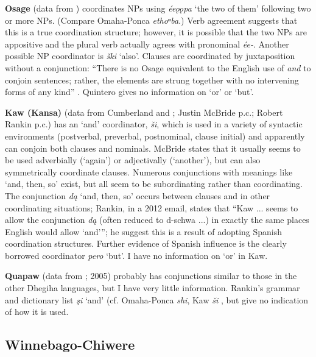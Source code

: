\documentclass[output=paper]{LSP/langsci}
\begin{document}
\textbf{Osage} (data from \citealt{Quintero2004}) coordinates NPs using \textit{\'ee\k{o}\k{o}pa} `the two of them' following two or more NPs. (Compare Omaha-Ponca \textit{ethoⁿba}.) Verb agreement suggests that this is a true coordination structure; however, it is possible that the two NPs are appositive and the plural verb actually agrees with pronominal \textit{\'ee-}. Another possible NP coordinator is \textit{\v{s}ki} `also'. Clauses are coordinated by juxtaposition without a conjunction: ``There is no Osage equivalent to the English use of \textit{and} to conjoin sentences; rather, the elements are strung together with no intervening forms of any kind'' . Quintero gives no information on `or' or `but'.

\textbf{Kaw (Kansa)} (data from Cumberland and \citealt{Rankin2012}; Justin McBride p.c.; Robert Rankin p.c.) has an `and' coordinator, \textit{\v{s}i}, which is used in a variety of syntactic environments (postverbal, preverbal, postnominal, clause initial) and apparently can conjoin both clauses and nominals. McBride states that it usually seems to be used adverbially (`again') or adjectivally (`another'), but can also symmetrically coordinate clauses. Numerous conjunctions with meanings like `and, then, so' exist, but all seem to be subordinating rather than coordinating. The conjunction \textit{d\k{a}} `and, then, so' occurs between clauses and in other coordinating situations; Rankin, in a 2012 email, states that ``Kaw ... seems to allow the conjunction \textit{d\k{a}} (often reduced to d-schwa ...) in exactly the same places English would allow `and'''; he suggest this is a result of adopting Spanish coordination structures. Further evidence of Spanish influence is the clearly borrowed coordinator \textit{pero} `but'. I have no information on `or' in Kaw.

\textbf{Quapaw} (data from \citealt{Rankin2002}; 2005) probably has conjunctions similar to those in the other Dhegiha languages, but I have very little information. Rankin's grammar and dictionary list \textit{\c{s}i} `and' (cf. Omaha-Ponca \textit{shi}, Kaw \textit{\v{s}i} , but give no indication of how it is used.

\subsection{Winnebago-Chiwere}
 
\end{document}
